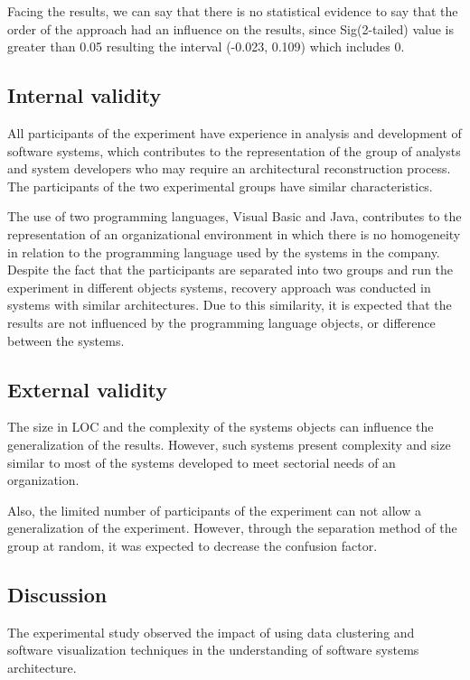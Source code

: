 \documentclass{sig-alternate-05-2015}
\begin{document}
 Facing the results, we can say that there is no statistical evidence to say that the order of the approach had an influence on the results, since Sig(2-tailed) value is greater than 0.05 resulting the interval (-0.023, 0.109) which includes 0.

\subsection{Internal validity}%

All participants of the experiment have experience in analysis and development of software systems, which contributes to the representation of the group of analysts and system developers who may require an architectural reconstruction process. The participants of the two experimental groups have similar characteristics.

The use of two programming languages, Visual Basic and Java, contributes to the representation of an organizational environment in which there is no homogeneity in relation to the programming language used by the systems in the company. Despite the fact that the participants are separated into two groups and run the experiment in different objects systems, recovery approach was conducted in systems with similar architectures. Due to this similarity, it is expected that the results are not influenced by the programming language objects, or difference between the systems.

\subsection{External validity}%
The size in LOC and the complexity of the systems objects can influence the generalization of the results. However, such systems present complexity and size similar to most of the systems developed to meet sectorial needs of an organization. 

Also, the limited number of participants of the experiment can not allow a generalization of the experiment. However, through the separation method of the group at random, it was expected to decrease the confusion factor.

\subsection{Discussion}

The experimental study observed the impact of using data clustering and software visualization techniques in the understanding of software systems architecture.
\end{document}
